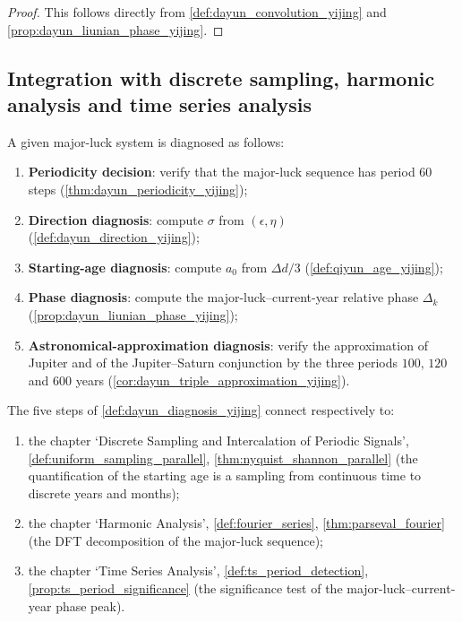 \begin{proof}
This follows directly from \cref{def:dayun_convolution_yijing} and \cref{prop:dayun_liunian_phase_yijing}.
\end{proof}

\subsection{Integration with discrete sampling, harmonic analysis and time series analysis}

\begin{definition}\label{def:dayun_diagnosis_yijing}
A given major-luck system is diagnosed as follows:
\begin{enumerate}[label=(\roman*)]
    \item \textbf{Periodicity decision}: verify that the major-luck sequence has period $60$ steps (\cref{thm:dayun_periodicity_yijing});
    \item \textbf{Direction diagnosis}: compute $\sigma$ from $(\epsilon,\eta)$ (\cref{def:dayun_direction_yijing});
    \item \textbf{Starting-age diagnosis}: compute $a_0$ from $\Delta d/3$ (\cref{def:qiyun_age_yijing});
    \item \textbf{Phase diagnosis}: compute the major-luck--current-year relative phase $\Delta_k$ (\cref{prop:dayun_liunian_phase_yijing});
    \item \textbf{Astronomical-approximation diagnosis}: verify the approximation of Jupiter and of the Jupiter--Saturn conjunction by the three periods $100$, $120$ and $600$ years (\cref{cor:dayun_triple_approximation_yijing}).
\end{enumerate}
\end{definition}

\begin{theorem}\label{thm:dayun_diagnosis_integration_yijing}
The five steps of \cref{def:dayun_diagnosis_yijing} connect respectively to:
\begin{enumerate}[label=(\roman*)]
    \item the chapter `Discrete Sampling and Intercalation of Periodic Signals', \cref{def:uniform_sampling_parallel}, \cref{thm:nyquist_shannon_parallel} (the quantification of the starting age is a sampling from continuous time to discrete years and months);
    \item the chapter `Harmonic Analysis', \cref{def:fourier_series}, \cref{thm:parseval_fourier} (the DFT decomposition of the major-luck sequence);
    \item the chapter `Time Series Analysis', \cref{def:ts_period_detection}, \cref{prop:ts_period_significance} (the significance test of the major-luck--current-year phase peak).
\end{enumerate}
\end{theorem}

